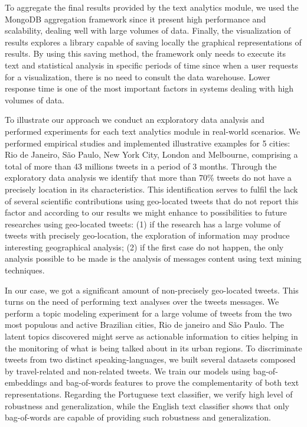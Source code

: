 To aggregate the final results provided by the text analytics module, we used the MongoDB aggregation framework since it present high performance and scalability, dealing well with large volumes of data. Finally, the visualization of results explores a library capable of saving locally the graphical representations of results. By using this saving method, the framework only needs to execute its text and statistical analysis in specific periods of time since when a user requests for a visualization, there is no need to consult the data warehouse. Lower response time is one of the most important factors in systems dealing with high volumes of data.

To illustrate our approach we conduct an exploratory data analysis and performed experiments for each text analytics module in real-world scenarios. We performed empirical studies and implemented illustrative examples for 5 cities: Rio de Janeiro, São Paulo, New York City, London and Melbourne, comprising a total of more than 43 millions tweets in a period of 3 months. Through the exploratory data analysis we identify that more than 70\% tweets do not have a precisely location in its characteristics. This identification serves to fulfil the lack of several scientific contributions using geo-located tweets that do not report this factor and according to our results we might enhance to possibilities to future researches using geo-located tweets: (1) if the research has a large volume of tweets with precisely geo-location, the exploration of information may produce interesting geographical analysis; (2) if the first case do not happen, the only analysis possible to be made is the analysis of messages content using text mining techniques.

In our case, we got a significant amount of non-precisely geo-located tweets. This turns on the need of performing text analyses over the tweets messages. We perform a topic modeling experiment for a large volume of tweets from the two most populous and active Brazilian cities, Rio de janeiro and São Paulo. The latent topics discovered might serve as actionable information to cities helping in the monitoring of what is being talked about in its urban regions. To discriminate tweets from two distinct speaking-languages, we built several datasets composed by travel-related and non-related tweets. We train our models using bag-of-embeddings and bag-of-words features to prove the complementarity of both text representations. Regarding the Portuguese text classifier, we verify high level of robustness and generalization, while the English text classifier shows that only bag-of-words are capable of providing such robustness and generalization.

